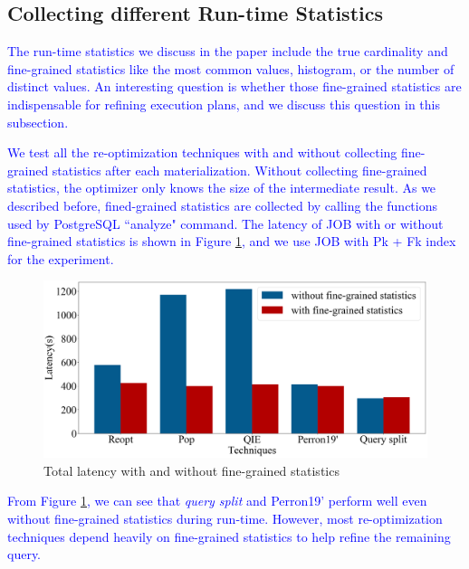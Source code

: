 \subsection{Collecting different Run-time Statistics} \label{S56}
\textcolor{blue}{
    The run-time statistics we discuss in the paper include the true cardinality and fine-grained statistics like the most common values, histogram, or the number of distinct values. An interesting question is whether those fine-grained statistics are indispensable for refining execution plans, and we discuss this question in this subsection.
}\par
\textcolor{blue}{
    We test all the re-optimization techniques with and without collecting fine-grained statistics after each materialization. Without collecting fine-grained statistics, the optimizer only knows the size of the intermediate result. As we described before, fined-grained statistics are collected by calling the functions used by PostgreSQL ``analyze" command. The latency of JOB with or without fine-grained statistics is shown in Figure \ref{F12}, and we use JOB with Pk + Fk index for the experiment.
}
    \begin{figure}[htb]
        \includegraphics[width=\linewidth]{./pic/Figure12.png}
        \centering
        \caption{Total latency with and without fine-grained statistics}
        \label{F12}
        \Description{}
    \end{figure}\par
\textcolor{blue}{
    From Figure \ref{F12}, we can see that \textit{query split} and Perron19' perform well even without fine-grained statistics during run-time. However, most re-optimization techniques depend heavily on fine-grained statistics to help refine the remaining query.
}